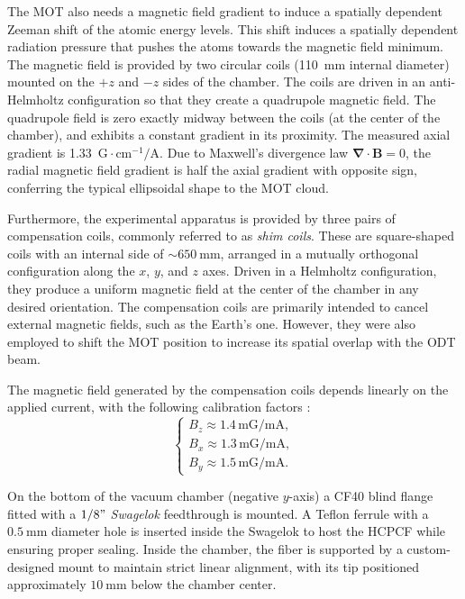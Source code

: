 The MOT also needs a magnetic field gradient to induce a spatially dependent Zeeman shift of the atomic energy levels.
This shift induces a spatially dependent radiation pressure that pushes the atoms towards the magnetic field minimum. The magnetic field is provided by two circular coils (110~mm internal diameter) mounted on the $+z$ and $-z$ sides of the chamber. The coils are driven in an anti-Helmholtz configuration so that they create a quadrupole magnetic field. The quadrupole field is zero exactly midway between the coils (at the center of the chamber), and exhibits a constant gradient in its proximity. The measured axial gradient is 1.33~$\text{G}\cdot\text{cm}^{-1}/\text{A}$. Due to Maxwell's divergence law $\mathbf{\nabla}\cdot\mathbf{B}=0$, the radial magnetic field gradient is half the axial gradient with opposite sign, conferring the typical ellipsoidal shape to the MOT cloud.

Furthermore, the experimental apparatus is provided by three pairs of compensation coils, commonly referred to as \textit{shim coils}. These are square-shaped coils with an internal side of $\sim 650~\text{mm}$, arranged in a mutually orthogonal configuration along the $x$, $y$, and $z$ axes. Driven in a Helmholtz configuration, they produce a uniform magnetic field at the center of the chamber in any desired orientation. The compensation coils are primarily intended to cancel external magnetic fields, such as the Earth's one. However, they were also employed to shift the MOT position to increase its spatial overlap with the ODT beam.

The magnetic field generated by the compensation coils depends linearly on the applied current, with the following calibration factors \cite{marchesini2025PHD}:
\begin{equation}
    \label{eq:shim_field_calibration}
    \begin{cases}
        B_{z} \approx 1.4 \, \text{mG/mA}, \\
        B_{x} \approx 1.3 \, \text{mG/mA}, \\
        B_{y} \approx 1.5 \, \text{mG/mA}.
\end{cases}
\end{equation}

On the bottom of the vacuum chamber (negative $y$-axis) a CF40 blind flange fitted with a $1/8"$ \textit{Swagelok} feedthrough is mounted. A Teflon ferrule with a $0.5~\text{mm}$ diameter hole is inserted inside the Swagelok to host the HCPCF while ensuring proper sealing. Inside the chamber, the fiber is supported by a custom-designed mount to maintain strict linear alignment, with its tip positioned approximately $10~\text{mm}$ below the chamber center.

